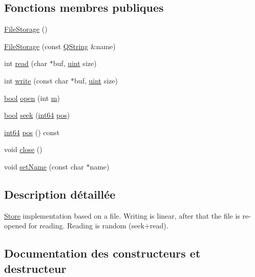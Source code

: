 \subsection*{Fonctions membres publiques}
\begin{DoxyCompactItemize}
\item 
\hyperlink{class_file_storage_a3a88a71218e6e8cb6c7af942ac1daf47}{File\+Storage} ()
\item 
\hyperlink{class_file_storage_afa4f6304190c22b38d504402aeeb8d12}{File\+Storage} (const \hyperlink{class_q_string}{Q\+String} \&name)
\item 
int \hyperlink{class_file_storage_ae28163449c4c40730b5e27b75362e22d}{read} (char $\ast$buf, \hyperlink{qglobal_8h_a4d3943ddea65db7163a58e6c7e8df95a}{uint} size)
\item 
int \hyperlink{class_file_storage_a9f680051229bda7bca2639e5464bca77}{write} (const char $\ast$buf, \hyperlink{qglobal_8h_a4d3943ddea65db7163a58e6c7e8df95a}{uint} size)
\item 
\hyperlink{qglobal_8h_a1062901a7428fdd9c7f180f5e01ea056}{bool} \hyperlink{class_file_storage_ae033a7582c81d34ce0dba7e3b9e261a4}{open} (int \hyperlink{060__command__switch_8tcl_a78d127e8bda64d4471ac811ad512fbd9}{m})
\item 
\hyperlink{qglobal_8h_a1062901a7428fdd9c7f180f5e01ea056}{bool} \hyperlink{class_file_storage_a1eccec51152846d9793e81abe6be2f3d}{seek} (\hyperlink{qglobal_8h_aecfc3c54bd29ad5964e1c1c3ccbf89df}{int64} \hyperlink{class_file_storage_aca71d590a66b59c587cdda09317ede93}{pos})
\item 
\hyperlink{qglobal_8h_aecfc3c54bd29ad5964e1c1c3ccbf89df}{int64} \hyperlink{class_file_storage_aca71d590a66b59c587cdda09317ede93}{pos} () const 
\item 
void \hyperlink{class_file_storage_a117ef83c02af566b40f58d9e7c93dbfd}{close} ()
\item 
void \hyperlink{class_file_storage_a34fae2b5ed8a461f14648784058098e2}{set\+Name} (const char $\ast$name)
\end{DoxyCompactItemize}


\subsection{Description détaillée}
\hyperlink{class_store}{Store} implementation based on a file. Writing is linear, after that the file is re-\/opened for reading. Reading is random (seek+read). 

\subsection{Documentation des constructeurs et destructeur}
\hypertarget{class_file_storage_a3a88a71218e6e8cb6c7af942ac1daf47}{}
